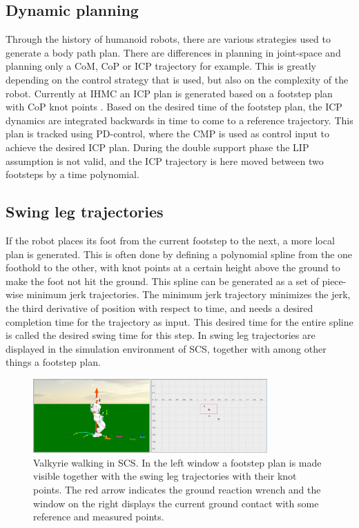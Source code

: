 \subsection{Dynamic planning}
Through the history of humanoid robots, there are various strategies used to generate a body path plan. There are differences in planning in joint-space and planning only a \ac{CoM}, \ac{CoP} or \ac{ICP} trajectory for example. This is greatly depending on the control strategy that is used, but also on the complexity of the robot. Currently at IHMC an \ac{ICP} plan is generated based on a footstep plan with \ac{CoP} knot points \cite{englsberger2014trajectory}. Based on the desired time of the footstep plan, the \ac{ICP} dynamics are integrated backwards in time to come to a reference trajectory. This plan is tracked using PD-control, where the \ac{CMP} is used as control input to achieve the desired \ac{ICP} plan. During the double support phase the \ac{LIP} assumption is not valid, and the \ac{ICP} trajectory is here moved between two footsteps by a time polynomial.  

\subsection{Swing leg trajectories}
If the robot places its foot from the current footstep to the next, a more local plan is generated. This is often done by defining a polynomial spline from the one foothold to the other, with knot points at a certain height above the ground to make the foot not hit the ground. This spline can be generated as a set of piece-wise minimum jerk trajectories. The minimum jerk trajectory minimizes the jerk, the third derivative of position with respect to time, and needs a desired completion time for the trajectory as input. This desired time for the entire spline is called the desired swing time for this step. In  swing leg trajectories are displayed in the simulation environment of \ac{SCS}, together with among other things a footstep plan.

\begin{figure}[h]
\centering
\includegraphics[width=0.8\textwidth]{STYLESTUFF/SCSValSS.png}
\caption{Valkyrie walking in \ac{SCS}. In the left window a footstep plan is made visible together with the swing leg trajectories with their knot points. The red arrow indicates the ground reaction wrench and the window on the right displays the current ground contact with some reference and measured points.}
\label{fig:scsval}
\end{figure}

